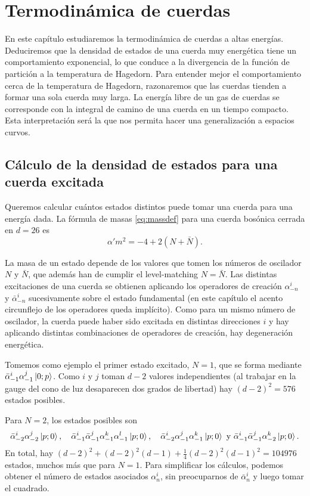 \chapter{Termodinámica de cuerdas}

En este capítulo estudiaremos la termodinámica de cuerdas a altas energías.
Deduciremos que la densidad de estados de una cuerda muy energética tiene un comportamiento
exponencial, lo que conduce a la divergencia de la función de partición a la temperatura de 
Hagedorn.
Para entender mejor el comportamiento cerca de la temperatura de Hagedorn, razonaremos 
que las cuerdas tienden a formar una sola cuerda muy larga.
La energía libre de un gas de cuerdas se corresponde con la integral de camino de una cuerda
en un tiempo compacto.
Esta interpretación será la que nos permita hacer una generalización a espacios curvos.

\section{Cálculo de la densidad de estados para una cuerda excitada}

Queremos calcular cuántos estados distintos puede tomar una cuerda para una energía dada.
La fórmula de masas \ref{eq:massdef} para una cuerda bosónica cerrada en $d=26$ es 
\begin{equation}
  \alpha' m^2=-4+2(N+\bar N).
\end{equation}

La masa de un estado depende de los valores que tomen los números de oscilador $N$ y $\bar N$, que además
han de cumplir el level-matching $N=\bar N$.
Las distintas excitaciones de una cuerda se obtienen aplicando los operadores
de creación $\alpha^i_{-n}$ y $\bar \alpha^i_{-n}$ sucesivamente sobre el estado fundamental (en este
capítulo el acento circunflejo de los operadores queda implícito).
Como para un mismo número de oscilador, la cuerda puede haber sido excitada en distintas direcciones
$i$ y hay aplicando distintas combinaciones de operadores de creación, hay degeneración energética.

Tomemos como ejemplo el primer estado excitado, $N=1$, que se forma mediante $\bar \alpha^i_{-1} \alpha^j_{-1} \ket{0;p}$.
Como $i$ y $j$ toman $d-2$ valores independientes (al trabajar en la gauge del cono de luz desaparecen dos grados de libertad)
hay $(d-2)^2=576$ estados posibles.

Para $N=2$, los estados posibles son
\begin{equation*}
  \bar \alpha^i_{-2} \alpha^j_{-2}\ket{p;0},  \quad
  \bar \alpha^i_{-1} \bar \alpha^j_{-1} \alpha^k_{-1} \alpha^l_{-1} \ket{p;0}, \quad
  \bar \alpha^i_{-2} \alpha^j_{-1} \alpha^k_{-1}\ket{p;0} \text{ y } 
  \bar \alpha^i_{-1} \bar \alpha^j_{-1} \alpha^k_{-2} \ket{p;0}.
\end{equation*}
En total, hay $(d-2)^2 + (d-2)^2(d-1) + \frac{1}{4}(d-2)^2(d-1)^2= 104976$ estados, muchos más que para $N=1$.
Para simplificar los cálculos, podemos obtener el número de estados asociados $\alpha^i_n$,
sin preocuparnos de $\bar \alpha^i_n$ y luego tomar el cuadrado.

